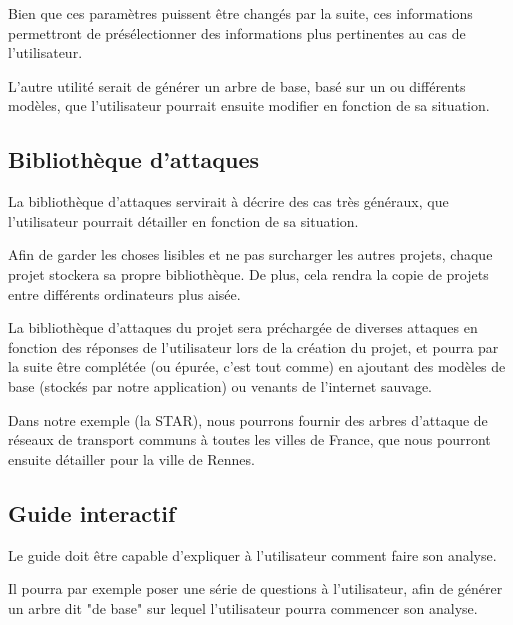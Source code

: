         Bien que ces paramètres puissent être changés par la suite, ces informations permettront de présélectionner des informations plus pertinentes au cas de l'utilisateur.
        
        L'autre utilité serait de générer un arbre de base, basé sur un ou différents modèles, que l'utilisateur pourrait ensuite modifier en fonction de sa situation.
    
    \subsection{Bibliothèque d'attaques}  
        La bibliothèque d'attaques servirait à décrire des cas très généraux, que l'utilisateur pourrait détailler en fonction de sa situation. 
        
        Afin de garder les choses lisibles et ne pas surcharger les autres projets, chaque projet stockera sa propre bibliothèque. De plus, cela rendra la copie de projets entre différents ordinateurs plus aisée.
        
        La bibliothèque d'attaques du projet sera préchargée de diverses attaques en fonction des réponses de l'utilisateur lors de la création du projet, et pourra par la suite être complétée (ou épurée, c'est tout comme) en ajoutant des modèles de base (stockés par notre application) ou venants de l'internet sauvage.
        
        Dans notre exemple (la STAR), nous pourrons fournir des arbres d'attaque de réseaux de transport communs à toutes les villes de France, que nous pourront ensuite détailler pour la ville de Rennes.
        
      
    \subsection{Guide interactif}
    	Le guide doit être capable d'expliquer à l'utilisateur comment faire son analyse. 
        
        Il pourra par exemple poser une série de questions à l'utilisateur, afin de générer un arbre dit "de base" sur lequel l'utilisateur pourra commencer son analyse.
        
